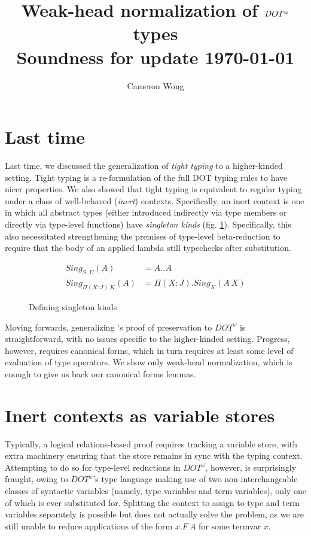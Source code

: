 \documentclass[a4paper, 10pt]{article}
\title{%
  Weak-head normalization of $\DOTw{}$ types \\
  \large Soundness for \DOTw{} update \today}
\author{Cameron Wong}
\newcommand{\DOTw}{\ensuremath{DOT^\omega}}
\newcommand{\interval}[3][]{#2 .._{#1} #3}
\newcommand{\KDepArr}[3]{\Pi(#1:#2).#3}
\newcommand{\Sing}[2]{Sing_{#2}(#1)}
\theoremstyle{definition}
\begin{document}
\maketitle


\setlength{\parskip}{\baselineskip}

\section{Last time}

Last time, we discussed the generalization of \emph{tight typing}
\citet{rapoport2017} to a higher-kinded setting. Tight typing is a
re-formulation of the full DOT typing rules to have nicer properties. We also
showed that tight typing is equivalent to regular typing under a class of
well-behaved (\emph{inert}) contexts. Specifically, an inert context is one in
which all abstract types (either introduced indirectly via type members or
directly via type-level functions) have \emph{singleton kinds} (fig.
\ref{fig:singletons}). Specifically, this also necessitated strengthening the
premises of type-level beta-reduction to require that the body of an applied
lambda still typechecks after substitution.

\begin{figure}[ht!]
  \begin{align*}
    \Sing{A}{\interval{S}{U}} &= \interval{A}{A} \\
    \Sing{A}{\KDepArr{X}{J}{K}} &= \KDepArr{X}{J}{\Sing{A\ X}{K}}
  \end{align*}
  \caption{Defining singleton kinds}\label{fig:singletons}
\end{figure}

Moving forwards, generalizing \citet{rapoport2017}'s proof of preservation to
$\DOTw{}$ is straightforward, with no issues specific to the higher-kinded
setting. Progress, however, requires canonical forms, which in turn requires at
least some level of evaluation of type operators. We show only weak-head
normalization, which is enough to give us back our canonical forms lemmas.

\section{Inert contexts as variable stores}

Typically, a logical relations-based proof requires tracking a variable store,
with extra machinery ensuring that the store remains in sync with the typing
context. Attempting to do so for type-level reductions in $\DOTw{}$, however,
is surprisingly fraught, owing to $\DOTw{}$'s type language making use of two
non-interchangeable classes of syntactic variables (namely, type variables and
term variables), only one of which is ever substituted for. Splitting the
context to assign to type and term variables separately is possible
but does not actually solve the problem, as we are still unable to reduce
applications of the form $x.F\ A$ for some termvar $x$.
\end{document}
